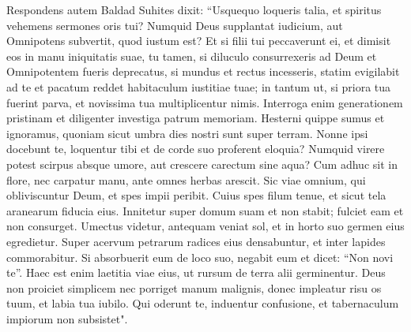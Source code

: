 \begin{biblechapter}  
\verse Respondens autem Baldad Suhites dixit: 
\verse “Usquequo loqueris talia, et spiritus vehemens sermones oris tui? 
\verse Numquid Deus supplantat iudicium, aut Omnipotens subvertit, quod iustum est? 
\verse Et si filii tui peccaverunt ei, et dimisit eos in manu iniquitatis suae, 
\verse tu tamen, si diluculo consurrexeris ad Deum et Omnipotentem fueris deprecatus, 
\verse si mundus et rectus incesseris, statim evigilabit ad te et pacatum reddet habitaculum iustitiae tuae; 
\verse in tantum ut, si priora tua fuerint parva, et novissima tua multiplicentur nimis. 
\verse Interroga enim generationem pristinam et diligenter investiga patrum memoriam. 
\verse Hesterni quippe sumus et ignoramus, quoniam sicut umbra dies nostri sunt super terram. 
\verse Nonne ipsi docebunt te, loquentur tibi et de corde suo proferent eloquia? 
\verse Numquid virere potest scirpus absque umore, aut crescere carectum sine aqua? 
\verse Cum adhuc sit in flore, nec carpatur manu, ante omnes herbas arescit. 
\verse Sic viae omnium, qui obliviscuntur Deum, et spes impii peribit. 
\verse Cuius spes filum tenue, et sicut tela aranearum fiducia eius. 
\verse Innitetur super domum suam et non stabit; fulciet eam et non consurget. 
\verse Umectus videtur, antequam veniat sol, et in horto suo germen eius egredietur. 
\verse Super acervum petrarum radices eius densabuntur, et inter lapides commorabitur. 
\verse Si absorbuerit eum de loco suo, negabit eum et dicet: “Non novi te”. 
\verse Haec est enim laetitia viae eius, ut rursum de terra alii germinentur. 
\verse Deus non proiciet simplicem nec porriget manum malignis, 
\verse donec impleatur risu os tuum, et labia tua iubilo. 
\verse Qui oderunt te, induentur confusione, et tabernaculum impiorum non subsistet". 
\end{biblechapter}

